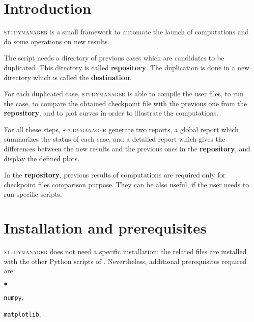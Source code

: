 \documentclass[a4paper,10pt,twoside]{csshortdoc}
\begin{document}
\def\contentsname{\textbf{\normalsize TABLE OF CONTENTS}\pdfbookmark[1]{Table of
contents}{contents}}

\renewcommand{\logocs}{cs_logo_wave}

\large
\makepdgCS
\normalsize

\passepage

\begin{center}\begin{singlespace}
\tableofcontents
\end{singlespace}\end{center}
%
\section{Introduction}

\textsc{studymanager} is a small framework to automate the launch of \CS
computations and do some operations on new results.

The script needs a directory of previous \CS cases which are candidates to be
duplicated. This directory is called \textbf{repository}. The duplication is
done in a new directory which is called the \textbf{destination}.

For each duplicated case, \textsc{studymanager} is able to compile the user
files, to run the case, to compare the obtained checkpoint file with the
previous one from the \textbf{repository}, and to plot curves in order to
illustrate the computations.

For all these steps, \textsc{studymanager} generate two reports,
a global report which summarizes the status of each case, and a detailed report
which gives the
differences between the new results and the previous ones in the
\textbf{repository}, and display the defined plots.

In the \textbf{repository}, previous results of computations are required only
for checkpoint files comparison purpose. They can be also useful, if the user
needs to run specific scripts.

\section{Installation and prerequisites}

\textsc{studymanager} does not need a specific installation: the related files
are installed with the other Python scripts of \CS. Nevertheless, additional
prerequisites required are:
\begin{list}{$\bullet$}{}
\item \texttt{numpy},
\item \texttt{matplotlib},
\end{list}
\end{document}
